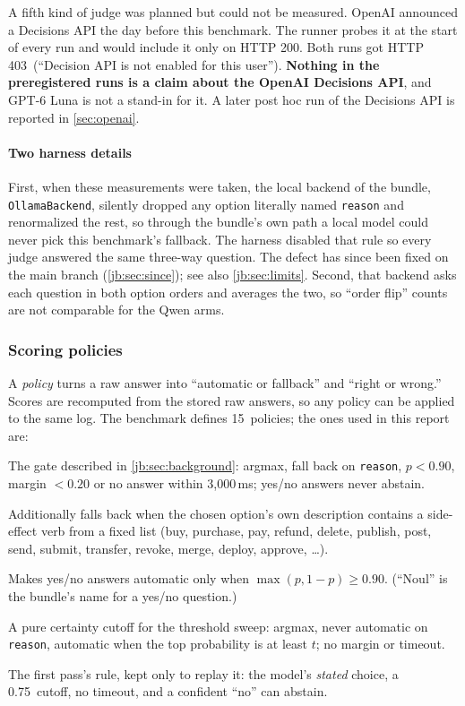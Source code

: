 \documentclass[11pt,letterpaper]{article}
\newcommand{\term}[1]{\emph{#1}}
\newcommand{\code}[1]{\texttt{#1}}
\newcommand{\HoldProbeMessage}{Decision API is not enabled for this user}
\newcommand{\HoldProbeStatus}{403}
\newcommand{\MinMargin}{0.20}
\newcommand{\MinP}{0.90}
\newcommand{\NumPolicies}{15}
\newcommand{\StudyCutoff}{0.75}
\newcommand{\TimeoutMs}{3{,}000}
\begin{document}
A fifth kind of judge was planned but could not be measured. OpenAI announced a Decisions API the day
before this benchmark. The runner probes it at the start of every run and would include it only on
HTTP 200. Both runs got HTTP \HoldProbeStatus\ (``\HoldProbeMessage''). \textbf{Nothing in the preregistered runs
is a claim about the OpenAI Decisions API}, and GPT-6 Luna is not a stand-in for it. A later post hoc run of the
Decisions API is reported in \cref{sec:openai}.

\paragraph{Two harness details} First, when these measurements were taken, the local backend of the
bundle, \code{OllamaBackend}, silently dropped any option literally named \code{reason} and renormalized the
rest, so through the bundle's own path a local model could never pick this benchmark's fallback. The
harness disabled that rule so every judge answered the same three-way question. The defect has since
been fixed on the main branch (\cref{jb:sec:since}); see also \cref{jb:sec:limits}. Second, that backend asks each question in both option orders and averages the two,
so ``order flip'' counts are not comparable for the Qwen arms.

\subsubsection{Scoring policies}

A \term{policy} turns a raw answer into ``automatic or fallback'' and ``right or wrong.'' Scores are
recomputed from the stored raw answers, so any policy can be applied to the same log. The benchmark
defines \NumPolicies\ policies; the ones used in this report are:
\begin{description}[leftmargin=1.2em,style=nextline]
  \item[\code{bundle-read-shortcut} (primary)] The gate described in \cref{jb:sec:background}: argmax, fall
    back on \code{reason}, $p<\MinP$, margin $<\MinMargin$ or no answer within \TimeoutMs\,ms; yes/no
    answers never abstain.
  \item[\code{+host-guard} (intervention I2)] Additionally falls back when the chosen option's own
    description contains a side-effect verb from a fixed list (buy, purchase, pay, refund, delete,
    publish, post, send, submit, transfer, revoke, merge, deploy, approve, \dots).
  \item[\code{+noul-gate} (intervention I3)] Makes yes/no answers automatic only when
    $\max(p, 1-p) \ge \MinP$. (``Noul'' is the bundle's name for a yes/no question.)
  \item[\code{cutoff-$t$}] A pure certainty cutoff for the threshold sweep: argmax, never automatic on
    \code{reason}, automatic when the top probability is at least $t$; no margin or timeout.
  \item[\code{study-0.75}] The first pass's rule, kept only to replay it: the model's \emph{stated}
    choice, a \StudyCutoff\ cutoff, no timeout, and a confident ``no'' can abstain.
\end{description}
\end{document}
